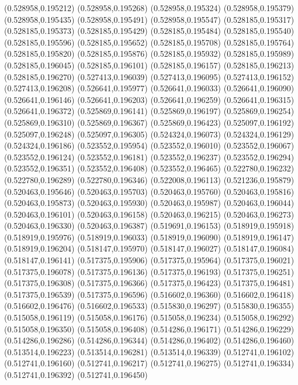 (0.528958,0.195212)
(0.528958,0.195268)
(0.528958,0.195324)
(0.528958,0.195379)
(0.528958,0.195435)
(0.528958,0.195491)
(0.528958,0.195547)
(0.528185,0.195317)
(0.528185,0.195373)
(0.528185,0.195429)
(0.528185,0.195484)
(0.528185,0.195540)
(0.528185,0.195596)
(0.528185,0.195652)
(0.528185,0.195708)
(0.528185,0.195764)
(0.528185,0.195820)
(0.528185,0.195876)
(0.528185,0.195932)
(0.528185,0.195989)
(0.528185,0.196045)
(0.528185,0.196101)
(0.528185,0.196157)
(0.528185,0.196213)
(0.528185,0.196270)
(0.527413,0.196039)
(0.527413,0.196095)
(0.527413,0.196152)
(0.527413,0.196208)
(0.526641,0.195977)
(0.526641,0.196033)
(0.526641,0.196090)
(0.526641,0.196146)
(0.526641,0.196203)
(0.526641,0.196259)
(0.526641,0.196315)
(0.526641,0.196372)
(0.525869,0.196141)
(0.525869,0.196197)
(0.525869,0.196254)
(0.525869,0.196310)
(0.525869,0.196367)
(0.525869,0.196423)
(0.525097,0.196192)
(0.525097,0.196248)
(0.525097,0.196305)
(0.524324,0.196073)
(0.524324,0.196129)
(0.524324,0.196186)
(0.523552,0.195954)
(0.523552,0.196010)
(0.523552,0.196067)
(0.523552,0.196124)
(0.523552,0.196181)
(0.523552,0.196237)
(0.523552,0.196294)
(0.523552,0.196351)
(0.523552,0.196408)
(0.523552,0.196465)
(0.522780,0.196232)
(0.522780,0.196289)
(0.522780,0.196346)
(0.522008,0.196113)
(0.521236,0.195879)
(0.520463,0.195646)
(0.520463,0.195703)
(0.520463,0.195760)
(0.520463,0.195816)
(0.520463,0.195873)
(0.520463,0.195930)
(0.520463,0.195987)
(0.520463,0.196044)
(0.520463,0.196101)
(0.520463,0.196158)
(0.520463,0.196215)
(0.520463,0.196273)
(0.520463,0.196330)
(0.520463,0.196387)
(0.519691,0.196153)
(0.518919,0.195918)
(0.518919,0.195976)
(0.518919,0.196033)
(0.518919,0.196090)
(0.518919,0.196147)
(0.518919,0.196204)
(0.518147,0.195970)
(0.518147,0.196027)
(0.518147,0.196084)
(0.518147,0.196141)
(0.517375,0.195906)
(0.517375,0.195964)
(0.517375,0.196021)
(0.517375,0.196078)
(0.517375,0.196136)
(0.517375,0.196193)
(0.517375,0.196251)
(0.517375,0.196308)
(0.517375,0.196366)
(0.517375,0.196423)
(0.517375,0.196481)
(0.517375,0.196539)
(0.517375,0.196596)
(0.516602,0.196360)
(0.516602,0.196418)
(0.516602,0.196476)
(0.516602,0.196533)
(0.515830,0.196297)
(0.515830,0.196355)
(0.515058,0.196119)
(0.515058,0.196176)
(0.515058,0.196234)
(0.515058,0.196292)
(0.515058,0.196350)
(0.515058,0.196408)
(0.514286,0.196171)
(0.514286,0.196229)
(0.514286,0.196286)
(0.514286,0.196344)
(0.514286,0.196402)
(0.514286,0.196460)
(0.513514,0.196223)
(0.513514,0.196281)
(0.513514,0.196339)
(0.512741,0.196102)
(0.512741,0.196160)
(0.512741,0.196217)
(0.512741,0.196275)
(0.512741,0.196334)
(0.512741,0.196392)
(0.512741,0.196450)
